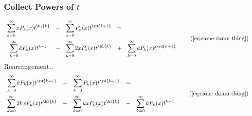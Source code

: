 
\begin{frame}\frametitle{Collect Powers of $t$}
\begin{equation}
	\begin{array}{ccccc c}
		\displaystyle\sum_{k=0}^{\infty}{xP_{k}(x)t^{\bl{k}}} 
			&-&
		\displaystyle\sum_{k=0}^{\infty}{P_{k}(x)t^{\rd{k+1}}} 
			&=& \\[15pt]
		\displaystyle\sum_{k=0}^{\infty}{k P_{k}(x)t^{k-1}}
			&-&
		\displaystyle\sum_{k=0}^{\infty}{2x P_{k}(x)t^{\bl{k}}}
			&+&
		\displaystyle\sum_{k=0}^{\infty}{k P_{k}(x)t^{\rd{k+1}}}
	\end{array}
\tag{\ref{eq:same-damn-thing}}
\end{equation}	
Rearrangement..
\begin{equation}
	\begin{array}{ccccc c}
		\displaystyle\sum_{k=0}^{\infty}{k P_{k}(x)t^{\rd{k+1}}}
			&+&
		\displaystyle\sum_{k=0}^{\infty}{P_{k}(x)t^{\rd{k+1}}} 
			&=& \\[15pt]
		\displaystyle\sum_{k=0}^{\infty}{2kx P_{k}(x)t^{\bl{k}}}
			&+&
		\displaystyle\sum_{k=0}^{\infty}{kxP_{k}(x)t^{\bl{k}}} 
			&-& 
		\displaystyle\sum_{k=0}^{\infty}{k P_{k}(x)t^{k-1}}
	\end{array}
\tag{\ref{eq:same-damn-thing}}
\end{equation}	
\end{frame}

